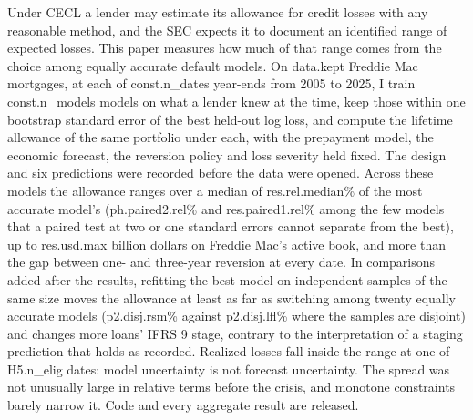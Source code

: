 Under CECL a lender may estimate its allowance for credit losses with any
reasonable method, and the SEC expects it to document an identified range of
expected losses. This paper measures how much of that range comes from the
choice among equally accurate default models. On \num{data.kept} Freddie
Mac mortgages, at each of \num{const.n_dates} year-ends from 2005 to 2025, I
train \num{const.n_models} models on what a lender knew at the time, keep those
within one bootstrap standard error of the best held-out log loss, and compute
the lifetime allowance of the same portfolio under each, with the prepayment
model, the economic forecast, the reversion policy and loss severity held
fixed. The design and six predictions were recorded before the data were
opened. Across these models the allowance ranges over a median of
\num{res.rel.median}\% of the most accurate model's (\num{ph.paired2.rel}\% and
\num{res.paired1.rel}\% among the few models that a paired test at two or one
standard errors cannot separate from the best), up to \num{res.usd.max} billion dollars on
Freddie Mac's active book, and more than the gap between one- and three-year
reversion at every date. In comparisons added after the results, refitting the best
model on independent samples of the same size moves the allowance at least as
far as switching among twenty equally accurate models (\num{p2.disj.rsm}\%
against \num{p2.disj.lfl}\% where the samples are disjoint) and changes more
loans' IFRS 9 stage, contrary to the interpretation of a staging prediction
that holds as recorded. Realized losses fall inside the
range at one of \num{H5.n_elig} dates: model uncertainty is not forecast
uncertainty. The spread was not unusually large in relative terms before the
crisis, and monotone constraints barely narrow it. Code and every aggregate
result are released.
